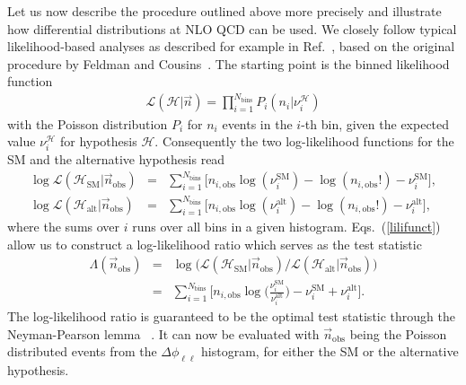 \documentclass{JHEP3}
\newcommand{\mrm}{\mathrm}
\newcommand{\SM}{\mathrm{SM}}
\newcommand{\alt}{\mathrm{alt}}
\def\HSM{\mathcal{H}_{\mathrm{SM}}}
\def\Halt{\mathcal{H}_{\mathrm{alt}}}
\newcommand{\be}{\begin{eqnarray}}
\newcommand{\ee}{\end{eqnarray}}
\begin{document}
Let us now describe the procedure outlined above more precisely and illustrate how differential distributions at NLO QCD can be used.
We closely follow typical likelihood-based analyses as described for example in Ref.~\cite{Cowan:2010js}, based on the original procedure by 
Feldman and Cousins~\cite{Feldman:1997qc}.
The starting point is the binned likelihood function 
\be
   \label{lili}
   \mathcal{L}(\mathcal{H}|\vec{n}) = \prod_{i=1}^{N_\mathrm{bins}} P_i(n_i|\nu_{i}^\mathcal{H})
\ee
with the Poisson distribution $P_i$ for $n_i$ events in the $i$-th bin, given the expected value $\nu_{i}^\mathcal{H}$ for hypothesis $\mathcal{H}$. 
Consequently the two log-likelihood functions for the SM and the alternative hypothesis read
\be
  \label{lilifunct}
  \log\mathcal{L}(\HSM |\vec{n}_\mathrm{obs})  &=& \sum_{i=1}^{N_\mathrm{bins}} \bigl[ n_{i,\mathrm{obs}}\log(\nu_i^{\SM}) -\log(n_{i,\mathrm{obs}}!) -\nu_i^{\SM}  \bigr], 
  \nonumber\\
  \log\mathcal{L}(\Halt|\vec{n}_\mathrm{obs})  &=& \sum_{i=1}^{N_\mathrm{bins}} \bigl[ n_{i,\mathrm{obs}}\log(\nu_i^{\alt})-\log(n_{i,\mathrm{obs}}!) -\nu_i^{\alt} \bigr],
\ee
where the sums over $i$ runs over all bins in a given histogram.
Eqs.~(\ref{lilifunct}) allow us to construct a log-likelihood ratio which serves as the test statistic
\be
  \Lambda(\vec{n}_\mathrm{obs}) &=& \log \biggl( \mathcal{L}(\HSM |\vec{n}_\mathrm{obs})  \big/ \mathcal{L}(\Halt|\vec{n}_\mathrm{obs})  \biggr)  
  \nonumber \\
                                &=& \sum_{i=1}^{N_\mathrm{bins}} \biggl[ n_{i,\mathrm{obs}}\log \biggl( \frac{\nu_i^{\SM}}{\nu_i^{\alt}} \biggr) -\nu_i^{\SM} + \nu_i^{\alt} \biggr].
\ee
The log-likelihood ratio is guaranteed to be the optimal test statistic through the Neyman-Pearson lemma ~\cite{NeymanPearsonLemma}. 
It can now be evaluated with $\vec{n}_{\mrm{obs}}$ being the Poisson distributed events from the  
$\Delta \phi_{\ell\ell}$ histogram, for either the SM or the alternative hypothesis.
\end{document}
